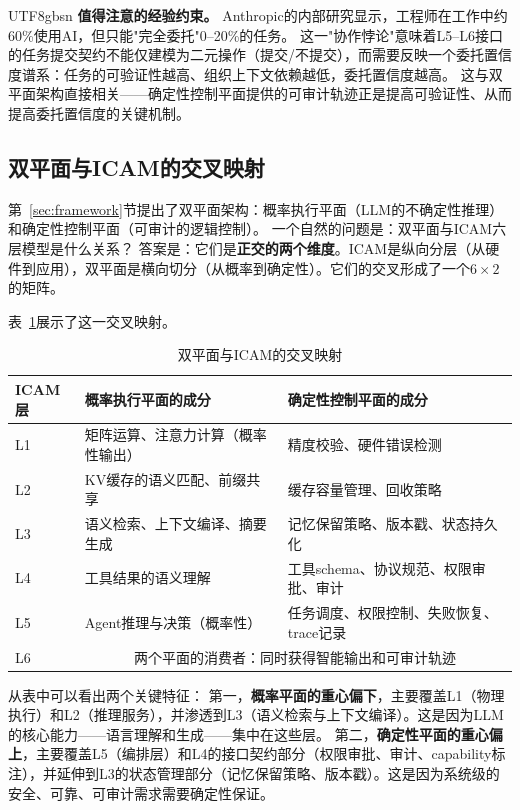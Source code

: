 \documentclass[11pt,a4paper]{article}
\begin{document}
\begin{CJK*}{UTF8}{gbsn}
\textbf{值得注意的经验约束。}
Anthropic的内部研究显示，工程师在工作中约60\%使用AI，但只能"完全委托"0--20\%的任务\cite{anthropic2026agenticreport}。
这一"协作悖论"意味着L5--L6接口的任务提交契约不能仅建模为二元操作（提交/不提交），而需要反映一个委托置信度谱系：任务的可验证性越高、组织上下文依赖越低，委托置信度越高。
这与双平面架构直接相关——确定性控制平面提供的可审计轨迹正是提高可验证性、从而提高委托置信度的关键机制。

\subsection{双平面与ICAM的交叉映射}
\label{sec:dual-plane-icam}

第~\ref{sec:framework}节提出了双平面架构：概率执行平面（LLM的不确定性推理）和确定性控制平面（可审计的逻辑控制）。
一个自然的问题是：双平面与ICAM六层模型是什么关系？
答案是：它们是\textbf{正交的两个维度}。ICAM是纵向分层（从硬件到应用），双平面是横向切分（从概率到确定性）。它们的交叉形成了一个$6 \times 2$的矩阵。

表~\ref{tab:dual-plane-icam}展示了这一交叉映射。

\begin{table}[t]
\centering
\footnotesize
\caption{双平面与ICAM的交叉映射}
\label{tab:dual-plane-icam}
\begin{tabularx}{\textwidth}{p{}p{}p{}}
\toprule
ICAM层 & 概率执行平面的成分 & 确定性控制平面的成分 \\
\midrule
L1 & 矩阵运算、注意力计算（概率性输出） & 精度校验、硬件错误检测 \\
L2 & KV缓存的语义匹配、前缀共享 & 缓存容量管理、回收策略 \\
L3 & 语义检索、上下文编译、摘要生成 & 记忆保留策略、版本戳、状态持久化 \\
L4 & 工具结果的语义理解 & 工具schema、协议规范、权限审批、审计 \\
L5 & Agent推理与决策（概率性） & 任务调度、权限控制、失败恢复、trace记录 \\
L6 & \multicolumn{2}{c}{两个平面的消费者：同时获得智能输出和可审计轨迹} \\
\bottomrule
\end{tabularx}
\end{table}

从表中可以看出两个关键特征：
第一，\textbf{概率平面的重心偏下}，主要覆盖L1（物理执行）和L2（推理服务），并渗透到L3（语义检索与上下文编译）。这是因为LLM的核心能力——语言理解和生成——集中在这些层。
第二，\textbf{确定性平面的重心偏上}，主要覆盖L5（编排层）和L4的接口契约部分（权限审批、审计、capability标注），并延伸到L3的状态管理部分（记忆保留策略、版本戳）。这是因为系统级的安全、可靠、可审计需求需要确定性保证。


\end{CJK*}
\end{document}
